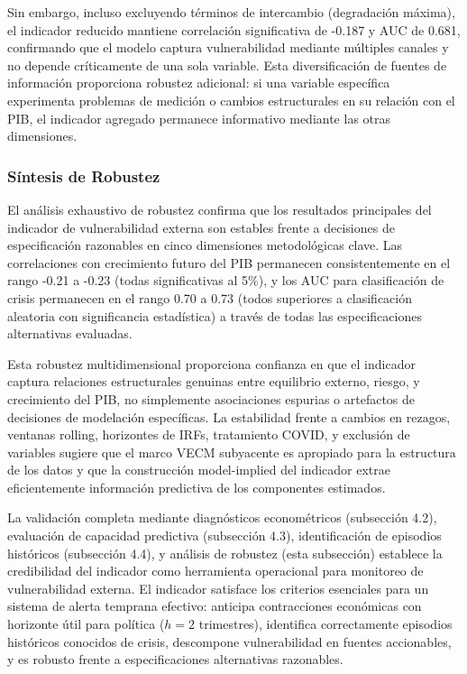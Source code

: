 \documentclass[3p,11pt,draft,natbib=false]{elsarticle}
\begin{document}
Sin embargo, incluso excluyendo términos de intercambio (degradación máxima), el indicador reducido mantiene correlación significativa de -0.187 y AUC de 0.681, confirmando que el modelo captura vulnerabilidad mediante múltiples canales y no depende críticamente de una sola variable. Esta diversificación de fuentes de información proporciona robustez adicional: si una variable específica experimenta problemas de medición o cambios estructurales en su relación con el PIB, el indicador agregado permanece informativo mediante las otras dimensiones.

\subsubsection{Síntesis de Robustez}

El análisis exhaustivo de robustez confirma que los resultados principales del indicador de vulnerabilidad externa son estables frente a decisiones de especificación razonables en cinco dimensiones metodológicas clave. Las correlaciones con crecimiento futuro del PIB permanecen consistentemente en el rango -0.21 a -0.23 (todas significativas al 5\%), y los AUC para clasificación de crisis permanecen en el rango 0.70 a 0.73 (todos superiores a clasificación aleatoria con significancia estadística) a través de todas las especificaciones alternativas evaluadas.

Esta robustez multidimensional proporciona confianza en que el indicador captura relaciones estructurales genuinas entre equilibrio externo, riesgo, y crecimiento del PIB, no simplemente asociaciones espurias o artefactos de decisiones de modelación específicas. La estabilidad frente a cambios en rezagos, ventanas rolling, horizontes de IRFs, tratamiento COVID, y exclusión de variables sugiere que el marco VECM subyacente es apropiado para la estructura de los datos y que la construcción model-implied del indicador extrae eficientemente información predictiva de los componentes estimados.

La validación completa mediante diagnósticos econométricos (subsección 4.2), evaluación de capacidad predictiva (subsección 4.3), identificación de episodios históricos (subsección 4.4), y análisis de robustez (esta subsección) establece la credibilidad del indicador como herramienta operacional para monitoreo de vulnerabilidad externa. El indicador satisface los criterios esenciales para un sistema de alerta temprana efectivo: anticipa contracciones económicas con horizonte útil para política ($h=2$ trimestres), identifica correctamente episodios históricos conocidos de crisis, descompone vulnerabilidad en fuentes accionables, y es robusto frente a especificaciones alternativas razonables.
\end{document}
